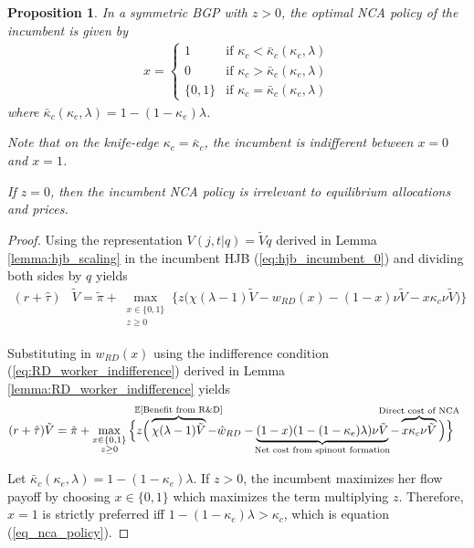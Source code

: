 \documentclass[11pt,english]{article}
\newtheorem{proposition}{Proposition}
\begin{document}
\begin{proposition}
	In a symmetric BGP with $z > 0$, the optimal NCA policy of the incumbent is given by
	\begin{align}
	x = \begin{cases}
	1 & \textrm{if } \kappa_{c} < \bar{\kappa}_c (\kappa_e, \lambda) \\
	0 & \textrm{if } \kappa_{c} > \bar{\kappa}_c (\kappa_e, \lambda)\\
	\{0,1\} & \textrm{if } \kappa_c = \bar{\kappa}_c (\kappa_e, \lambda) 
	\end{cases} \label{eq_nca_policy}
	\end{align}
	where $\bar{\kappa}_c (\kappa_e, \lambda) = 1 - (1-\kappa_e)\lambda$.
	
	Note that on the knife-edge $\kappa_c = \bar{\kappa}_c$, the incumbent is indifferent between $x = 0$ and $x = 1$. 
	
	If $z = 0$, then the incumbent NCA policy is irrelevant to equilibrium allocations and prices.
\end{proposition}

\begin{proof}
	Using the representation $V(j,t|q) = \tilde{V}q$ derived in Lemma \ref{lemma:hjb_scaling} in the incumbent HJB (\ref{eq:hjb_incumbent_0}) and dividing both sides by $q$ yields
	\begin{align}
	(r + \hat{\tau}) &\tilde{V} = \tilde{\pi} + \max_{\substack{x \in \{0,1\} \\ z \ge 0}} \Bigg\{ z \Big( \chi (\lambda -1) \tilde{V}- w_{RD}(x) - (1-x) \nu \tilde{V} - x \kappa_c \nu \tilde{V} \Big)\Bigg\} \label{eq:hjb_incumbent_1}
	\end{align}
	
	Substituting in $w_{RD}(x)$ using the indifference condition (\ref{eq:RD_worker_indifference}) derived in Lemma \ref{lemma:RD_worker_indifference} yields
	\begin{align}
	(r + \hat{\tau}) \tilde{V} &= \tilde{\pi} + \max_{\substack{x \in \{0,1\} \\ z \ge 0}} \Big\{z \Big( \overbrace{\chi (\lambda - 1) \tilde{V}}^{\mathclap{\mathbb{E}[\textrm{Benefit from R\&D}]}}- \hat{w}_{RD} -  \underbrace{(1-x)(1 - (1-\kappa_{e})\lambda)\nu \tilde{V}}_{\mathclap{\text{Net cost from spinout formation}}} - \overbrace{x \kappa_{c} \nu \tilde{V}}^{\mathclap{\text{Direct cost of NCA}}}\Big) \Big\} \label{eq:hjb_incumbent_workerIndiff}
	\end{align}

	
	Let $\bar{\kappa}_c (\kappa_e, \lambda) = 1 - (1-\kappa_e)\lambda$. If $z > 0$, the incumbent maximizes her flow payoff by choosing $x \in \{0,1\}$ which maximizes the term multiplying $z$. Therefore, $x = 1$ is strictly preferred iff $1 - (1-\kappa_e) \lambda > \kappa_c$, which is equation (\ref{eq_nca_policy}).
\end{proof}
\end{document}
